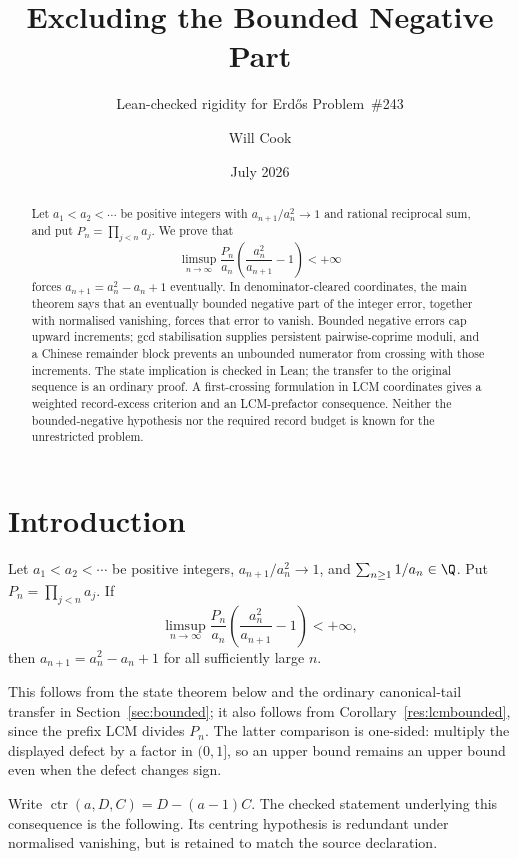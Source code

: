 \documentclass[11pt]{article}
\title{Excluding the Bounded Negative Part}
\subtitle{Lean-checked rigidity for Erd\H{o}s Problem~\#243}
\author{Will Cook}
\date{July 2026}
\newcommand{\ctr}{\operatorname{ctr}}
\begin{document}
\maketitle
\noteprovenance

\begin{abstract}
\noindent
Let $a_1<a_2<\cdots$ be positive integers with $a_{n+1}/a_n^2\to1$
and rational reciprocal sum, and put $P_n=\prod_{j<n}a_j$.
We prove that
\[
 \limsup_{n\to\infty}\frac{P_n}{a_n}
 \left(\frac{a_n^2}{a_{n+1}}-1\right)<+\infty
\]
forces $a_{n+1}=a_n^2-a_n+1$ eventually.  In denominator-cleared
coordinates, the main theorem says that an eventually bounded negative
part of the integer error, together with normalised vanishing, forces that
error to vanish.  Bounded negative errors cap upward increments; gcd
stabilisation supplies persistent pairwise-coprime moduli, and a Chinese
remainder block prevents an unbounded numerator from crossing with those
increments.  The state implication is checked in Lean; the transfer to the
original sequence is an ordinary proof.  A first-crossing formulation in
LCM coordinates gives a weighted record-excess criterion and an
LCM-prefactor consequence.  Neither the bounded-negative hypothesis nor
the required record budget is known for the unrestricted problem.
\end{abstract}

\section{Introduction}\label{sec:problem}

\begin{corollary}\label{res:originalbounded}
Let $a_1<a_2<\cdots$ be positive integers, $a_{n+1}/a_n^2\to1$, and
$\sum_{n\ge1}1/a_n\in\Q$.  Put $P_n=\prod_{j<n}a_j$.  If
\[
 \limsup_{n\to\infty}\frac{P_n}{a_n}
 \left(\frac{a_n^2}{a_{n+1}}-1\right)<+\infty,
\]
then $a_{n+1}=a_n^2-a_n+1$ for all sufficiently large $n$.
\end{corollary}

This follows from the state theorem below and the ordinary canonical-tail
transfer in Section~\ref{sec:bounded}; it also follows from
Corollary~\ref{res:lcmbounded}, since the prefix LCM divides $P_n$.
The latter comparison is one-sided: multiply the displayed defect by a
factor in $(0,1]$, so an upper bound remains an upper bound even when the
defect changes sign.

Write $\ctr(a,D,C)=D-(a-1)C$.  The checked statement underlying this
consequence is the following.  Its centring hypothesis is redundant under
normalised vanishing, but is retained to match the source declaration.
\end{document}
